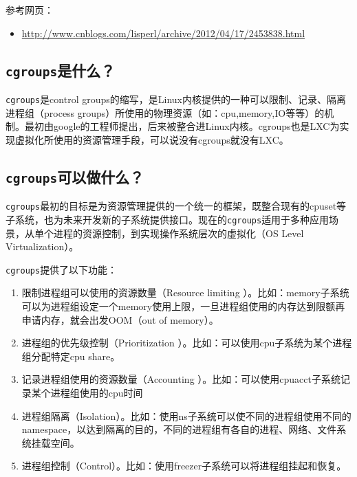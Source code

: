 \documentclass[doctor,openright,twoside]{sjtuthesis}
\providecommand{\tightlist}{%
    \setlength{\itemsep}{0pt}\setlength{\parskip}{0pt}}
\newcommand{\passthrough}[1]{#1}
\theoremstyle{plain}
\theoremstyle{definition}
\theoremstyle{remark}
\theoremstyle{ocrenumbox}
\theoremstyle{plain}
\begin{document}
参考网页：

\begin{itemize}
\tightlist
\item
  \url{http://www.cnblogs.com/lisperl/archive/2012/04/17/2453838.html}
\end{itemize}

\hypertarget{cgroups}{%
\subsection{\texorpdfstring{\texttt{cgroups}是什么？}{cgroups是什么？}}\label{cgroups}}

\passthrough{\lstinline!cgroups!}是control
groups的缩写，是Linux内核提供的一种可以限制、记录、隔离进程组（process
groups）所使用的物理资源（如：cpu,memory,IO等等）的机制。最初由google的工程师提出，后来被整合进Linux内核。cgroups也是LXC为实现虚拟化所使用的资源管理手段，可以说没有cgroups就没有LXC。

\hypertarget{cgroups}{%
\subsection{\texorpdfstring{\texttt{cgroups}可以做什么？}{cgroups可以做什么？}}\label{cgroups}}

\passthrough{\lstinline!cgroups!}最初的目标是为资源管理提供的一个统一的框架，既整合现有的cpuset等子系统，也为未来开发新的子系统提供接口。现在的\passthrough{\lstinline!cgroups!}适用于多种应用场景，从单个进程的资源控制，到实现操作系统层次的虚拟化（OS
Level Virtualization）。

\passthrough{\lstinline!cgroups!}提供了以下功能：

\begin{enumerate}
\def\labelenumi{\arabic{enumi}.}
\tightlist
\item
  限制进程组可以使用的资源数量（Resource limiting
  ）。比如：memory子系统可以为进程组设定一个memory使用上限，一旦进程组使用的内存达到限额再申请内存，就会出发OOM（out
  of memory）。
\item
  进程组的优先级控制（Prioritization
  ）。比如：可以使用cpu子系统为某个进程组分配特定cpu share。
\item
  记录进程组使用的资源数量（Accounting
  ）。比如：可以使用cpuacct子系统记录某个进程组使用的cpu时间
\item
  进程组隔离（Isolation）。比如：使用ns子系统可以使不同的进程组使用不同的namespace，以达到隔离的目的，不同的进程组有各自的进程、网络、文件系统挂载空间。
\item
  进程组控制（Control）。比如：使用freezer子系统可以将进程组挂起和恢复。
\end{enumerate}
\end{document}
